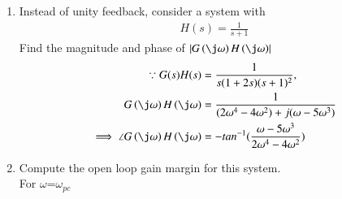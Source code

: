 \begin{enumerate}[label=\thesubsection.\arabic*.,ref=\thesubsection.\theenumi]
\item Instead of unity feedback, consider a system with 
%
\begin{align}
H(s)=\frac{1}{s+1}
\end{align}
%
Find the magnitude and phase of $\abs{G\brak{\j\omega}H\brak{\j\omega}}$
\\
\solution 
%
\begin{align}
\because G(s)H(s) & =\frac{1}{s(1+2s)(s+1)^{2}},
\\
G\brak{\j\omega}H\brak{\j\omega} &= \frac{1}{(2\omega^4-4\omega^2) +j(\omega-5\omega^3)}
\\
\implies \angle G\brak{\j\omega}H\brak{\j\omega} &= -tan^{-1}(\frac{\omega-5\omega^3}{2\omega^4-4\omega^2})
\end{align}

\item Compute the open loop gain margin for this system.
\\
\solution 
For $\omega$=$\omega_{pc}$ 


\end{enumerate}
